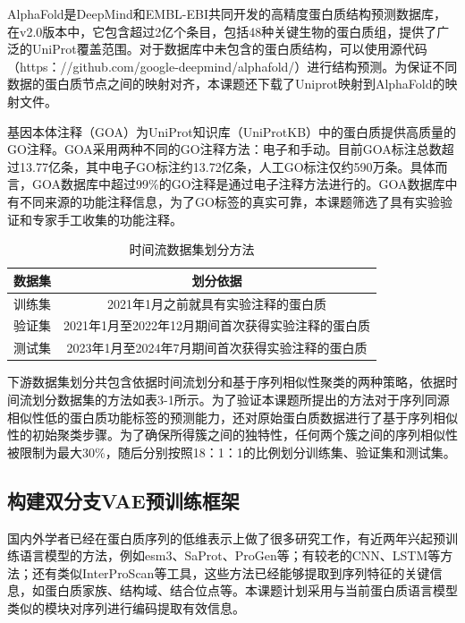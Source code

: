 AlphaFold是DeepMind和EMBL-EBI共同开发的高精度蛋白质结构预测数据库，在v2.0版本中，它包含超过2亿个条目，包括48种关键生物的蛋白质组，提供了广泛的UniProt覆盖范围。对于数据库中未包含的蛋白质结构，可以使用源代码（https：//github.com/google-deepmind/alphafold/）进行结构预测。为保证不同数据的蛋白质节点之间的映射对齐，本课题还下载了Uniprot映射到AlphaFold的映射文件。

基因本体注释（GOA）为UniProt知识库（UniProtKB）中的蛋白质提供高质量的GO注释。GOA采用两种不同的GO注释方法：电子和手动\cite{barrell2009goa}。目前GOA标注总数超过13.77亿条，其中电子GO标注约13.72亿条，人工GO标注仅约590万条。具体而言，GOA数据库中超过99\%的GO注释是通过电子注释方法进行的。GOA数据库中有不同来源的功能注释信息，为了GO标签的真实可靠，本课题筛选了具有实验验证和专家手工收集的功能注释。

\begin{table}[h]
\centering
\caption{时间流数据集划分方法}
\begin{tabular}{@{}cc@{}}
\toprule
\textbf{数据集} & \textbf{划分依据} \\ \midrule
训练集 & 2021年1月之前就具有实验注释的蛋白质 \\ 
验证集 & 2021年1月至2022年12月期间首次获得实验注释的蛋白质 \\ 
测试集 & 2023年1月至2024年7月期间首次获得实验注释的蛋白质 \\ \bottomrule
\end{tabular}
\end{table}

下游数据集划分共包含依据时间流划分和基于序列相似性聚类的两种策略，依据时间流划分数据集的方法如表3-1所示。为了验证本课题所提出的方法对于序列同源相似性低的蛋白质功能标签的预测能力，还对原始蛋白质数据进行了基于序列相似性的初始聚类步骤。为了确保所得簇之间的独特性，任何两个簇之间的序列相似性被限制为最大30\%，随后分别按照18：1：1的比例划分训练集、验证集和测试集。

\subsection{构建双分支VAE预训练框架}
国内外学者已经在蛋白质序列的低维表示上做了很多研究工作，有近两年兴起预训练语言模型的方法，例如esm3\cite{hayes2024simulating}、SaProt\cite{su2023saprot}、ProGen\cite{madani2020progen}等；有较老的CNN\cite{li2021survey}、LSTM\cite{yu2019review}等方法；还有类似InterProScan\cite{jones2014interproscan}等工具，这些方法已经能够提取到序列特征的关键信息，如蛋白质家族、结构域、结合位点等。本课题计划采用与当前蛋白质语言模型类似的模块对序列进行编码提取有效信息。

